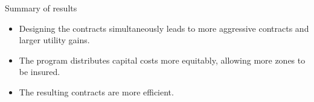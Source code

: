 \documentclass{beamer}
\begin{document}
    

\begin{frame}{Summary of results}
    \begin{itemize}
        \item Designing the contracts simultaneously leads to more aggressive contracts and larger utility gains.
        \item The program distributes capital costs more equitably, allowing more zones to be insured. 
        \item The resulting contracts are more efficient. 
    \end{itemize}
\end{frame}

\end{document}
